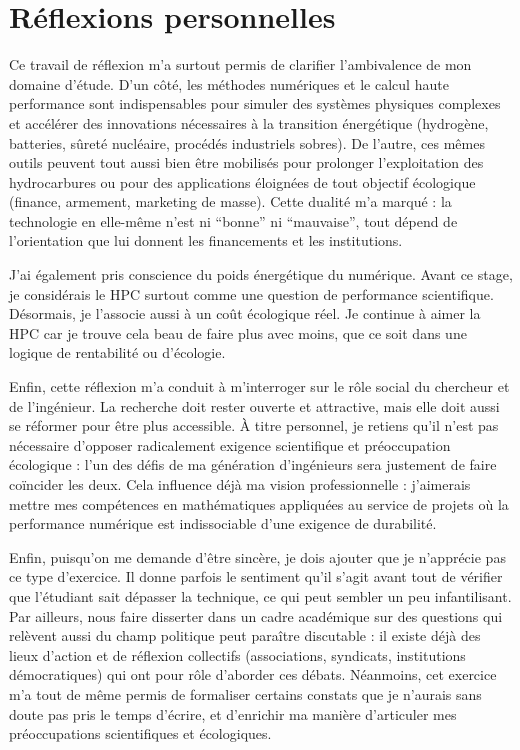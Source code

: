 \documentclass[11pt,a4paper]{article}
\begin{document}
\section{Réflexions personnelles}
Ce travail de réflexion m’a surtout permis de clarifier l’ambivalence de mon domaine d’étude. 
D’un côté, les méthodes numériques et le calcul haute performance sont indispensables pour simuler 
des systèmes physiques complexes et accélérer des innovations nécessaires à la transition énergétique 
(hydrogène, batteries, sûreté nucléaire, procédés industriels sobres). 
De l’autre, ces mêmes outils peuvent tout aussi bien être mobilisés pour prolonger l’exploitation 
des hydrocarbures ou pour des applications éloignées de tout objectif écologique (finance, armement, 
marketing de masse). Cette dualité m’a marqué : la technologie en elle-même n’est ni “bonne” ni “mauvaise”, 
tout dépend de l’orientation que lui donnent les financements et les institutions.

J’ai également pris conscience du poids énergétique du numérique. Avant ce stage, je considérais le HPC 
surtout comme une question de performance scientifique. Désormais, je l’associe aussi à un coût écologique réel.
Je continue à aimer la HPC car je trouve cela beau de faire plus avec moins, que ce soit dans une logique de rentabilité 
ou d'écologie.

Enfin, cette réflexion m’a conduit à m’interroger sur le rôle social du chercheur et de l’ingénieur. 
La recherche doit rester ouverte et attractive, mais elle doit aussi se réformer pour être plus accessible. 
À titre personnel, je retiens qu’il n’est pas nécessaire d’opposer radicalement exigence scientifique et 
préoccupation écologique : l’un des défis de ma génération d’ingénieurs sera justement de faire coïncider les deux. 
Cela influence déjà ma vision professionnelle : j’aimerais mettre mes compétences en mathématiques appliquées 
au service de projets où la performance numérique est indissociable d’une exigence de durabilité.

Enfin, puisqu’on me demande d’être sincère, je dois ajouter que je n’apprécie pas ce type d’exercice. 
Il donne parfois le sentiment qu’il s’agit avant tout de vérifier que l’étudiant sait dépasser la technique, 
ce qui peut sembler un peu infantilisant. 
Par ailleurs, nous faire disserter dans un cadre académique sur des questions qui relèvent aussi du champ politique 
peut paraître discutable : il existe déjà des lieux d’action et de réflexion collectifs (associations, syndicats, institutions démocratiques) 
qui ont pour rôle d’aborder ces débats. 
Néanmoins, cet exercice m’a tout de même permis de formaliser certains constats que je n’aurais sans doute pas pris le temps d’écrire, 
et d’enrichir ma manière d’articuler mes préoccupations scientifiques et écologiques.


        
\end{document}
